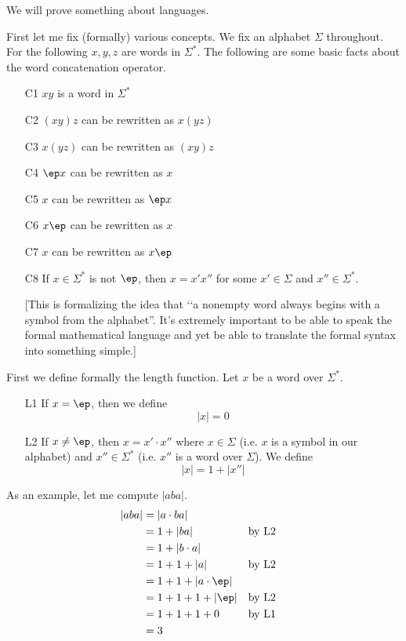 


\renewcommand\TITLE{Assignment 4}

\renewcommand\AUTHOR{David Campbell}
\renewcommand\EMAIL{djcampbell2@cougars.ccis.edu}


\topmatter

We will prove something about languages.

First let me fix (formally) various concepts.
We fix an alphabet $\Sigma$ throughout.
For the following $x,y,z$ are words in $\Sigma^*$.
The following are some basic facts about the word concatenation operator.
\begin{enumerate}
\item[C1] $xy$ is a word in $\Sigma^*$
\item[C2] $(xy)z$ can be rewritten as $x(yz)$
\item[C3] $x(yz)$ can be rewritten as $(xy)z$
\item[C4] $\ep x$ can be rewritten as $x$
\item[C5] $x$ can be rewritten as $\ep x$
\item[C6] $x\ep$ can be rewritten as $x$
\item[C7] $x$ can be rewritten as $x\ep$
\item[C8] If $x \in \Sigma^*$ is not $\ep$, then 
$x = x'x''$ for some $x' \in \Sigma$ and $x'' \in \Sigma^*$.

[This is formalizing the idea that 
\lq\lq a nonempty word always begins with a symbol from the alphabet''.
It's extremely important to be able to speak the formal
mathematical language and yet be able to translate the formal 
syntax into something simple.]
\end{enumerate}

\newpage
First we define formally the length function.
Let $x$ be a word over $\Sigma^*$.
\begin{enumerate}
\item[L1] If $x = \ep$, then we define
\[
|x| = 0
\]
\item[L2] If $x \neq \ep$, then $x = x' \cdot x''$ where
$x \in \Sigma$ (i.e. $x$ is a symbol in our alphabet)
and $x'' \in \Sigma^*$ (i.e. $x''$ is a word over $\Sigma$).
We define 
\[
|x| = 1 + |x''|
\]
\end{enumerate}
As an example, let me compute $|aba|$.
\begin{align*}
|aba| 
&= |a \cdot ba|                           \\
&= 1 + |ba|              & & \text{by L2} \\
&= 1 + |b \cdot a|                        \\
&= 1 + 1 + |a|           & & \text{by L2} \\
&= 1 + 1 + |a \cdot \ep| & &              \\
&= 1 + 1 + 1 + |\ep|     & & \text{by L2} \\
&= 1 + 1 + 1 + 0         & & \text{by L1} \\
&= 3 
\end{align*}

